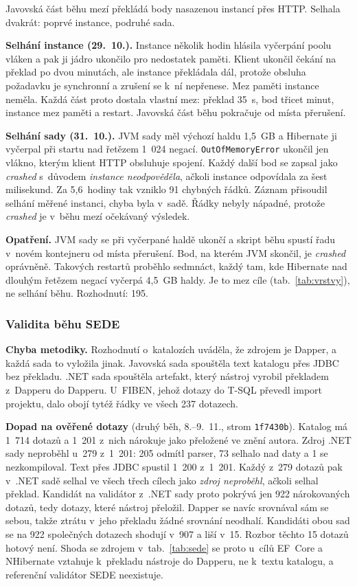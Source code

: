 Javovská část běhu mezí překládá body nasazenou instancí přes HTTP. Selhala dvakrát: poprvé instance, podruhé sada.

\textbf{Selhání instance (29.~10.).} Instance několik hodin hlásila vyčerpání poolu vláken a pak ji jádro ukončilo pro nedostatek paměti. Klient ukončil čekání na překlad po dvou minutách, ale instance překládala dál, protože obsluha požadavku je synchronní a zrušení se k~ní nepřenese. Mez paměti instance neměla. Každá část proto dostala vlastní mez: překlad 35~s, bod třicet minut, instance mez paměti a restart. Javovská část běhu pokračuje od místa přerušení.

\textbf{Selhání sady (31.~10.).} JVM sady měl výchozí haldu 1,5~GB a Hibernate ji vyčerpal při startu nad řetězem 1~024 negací. \texttt{OutOfMemoryError} ukončil jen vlákno, kterým klient HTTP obsluhuje spojení. Každý další bod se zapsal jako \emph{crashed} s~důvodem \emph{instance neodpověděla}, ačkoli instance odpovídala za šest milisekund. Za 5,6~hodiny tak vzniklo 91 chybných řádků. Záznam přisoudil selhání měřené instanci, chyba byla v~sadě. Řádky nebyly nápadné, protože \emph{crashed} je v~běhu mezí očekávaný výsledek.

\textbf{Opatření.} JVM sady se při vyčerpané haldě ukončí a skript běhu spustí řadu v~novém kontejneru od místa přerušení. Bod, na kterém JVM skončil, je \emph{crashed} oprávněně. Takových restartů proběhlo sedmnáct, každý tam, kde Hibernate nad dlouhým řetězem negací vyčerpá 4,5~GB haldy. Je to mez cíle (tab.~\ref{tab:vrstvy}), ne selhání běhu. Rozhodnutí: 195.

\subsubsection*{Validita běhu SEDE}

\textbf{Chyba metodiky.} Rozhodnutí o~katalozích uváděla, že zdrojem je Dapper, a každá sada to vyložila jinak. Javovská sada spouštěla text katalogu přes JDBC bez překladu. .NET sada spouštěla artefakt, který nástroj vyrobil překladem z~Dapperu do Dapperu. U~FIBEN, jehož dotazy do T-SQL převedl import projektu, dalo obojí tytéž řádky ve všech 237 dotazech.

\textbf{Dopad na ověřené dotazy} (druhý běh, 8.--9.~11., strom \texttt{1f7430b}). Katalog má 1~714 dotazů a 1~201 z~nich nárokuje jako přeložené ve znění autora. Zdroj .NET sady neproběhl u~279 z~1~201: 205 odmítl parser, 73 selhalo nad daty a 1 se nezkompiloval. Text přes JDBC spustil 1~200 z~1~201. Každý z~279 dotazů pak v~.NET sadě selhal ve všech třech cílech jako \emph{zdroj neproběhl}, ačkoli selhal překlad. Kandidát na validátor z~.NET sady proto pokrývá jen 922 nárokovaných dotazů, tedy dotazy, které nástroj přeložil. Dapper se navíc srovnával sám se sebou, takže ztrátu v~jeho překladu žádné srovnání neodhalí. Kandidáti obou sad se na 922 společných dotazech shodují v~907 a liší v~15. Rozbor těchto 15 dotazů hotový není. Shoda se zdrojem v~tab.~\ref{tab:sede} se proto u~cílů EF~Core a NHibernate vztahuje k~překladu nástroje do Dapperu, ne k~textu katalogu, a referenční validátor SEDE neexistuje.

